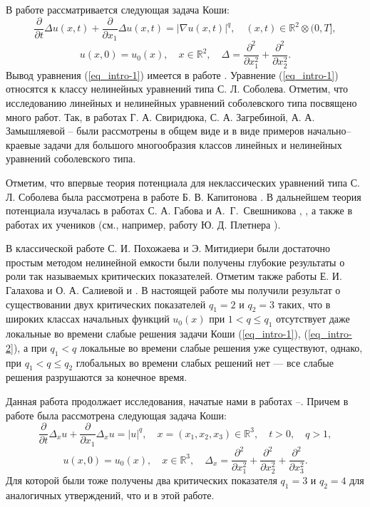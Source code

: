 В работе рассматривается следующая задача Коши:
\begin{equation}\label{eq_intro-1}
\dfrac{\partial}{\partial t}\Delta u(x,t)+\dfrac{\partial}{\partial x_1}\Delta u(x,t)=|\nabla u(x,t)|^q,\quad (x,t)\in\mathbb{R}^2\otimes(0,T],
\end{equation}
\begin{equation}\label{eq_intro-2}
u(x,0)=u_0(x),\quad x\in\mathbb{R}^2,\quad\Delta=\dfrac{\partial^2}{\partial x^2_1}+\dfrac{\partial^2}{\partial x^2_2}.
\end{equation}
Вывод уравнения (\ref{eq_intro-1}) имеется в работе \cite{bagdoev}. Уравнение (\ref{eq_intro-1}) относятся к классу нелинейных уравнений типа С. Л. Соболева. Отметим, что исследованию линейных и нелинейных уравнений соболевского типа посвящено много работ. Так, в работах Г. А. Свиридюка, С. А. Загребиной, А. А. Замышляевой \cite{svirid1}--\cite{svirid3} были рассмотрены в общем виде и в виде примеров начально--краевые задачи для большого многообразия классов линейных и нелинейных уравнений соболевского типа.

Отметим, что впервые теория потенциала для неклассических уравнений типа С. Л. Соболева была рассмотрена в работе Б. В. Капитонова \cite{Kapitonov}. В дальнейшем теория потенциала изучалась в работах С. А. Габова и А.~Г.~Свешникова \cite{sveshnikov}, \cite{Gabov2}, а также в работах их учеников (см., например, работу Ю. Д. Плетнера \cite{pletner}).

В классической работе \cite{pokhozaev1} С. И. Похожаева и Э. Митидиери были достаточно простым методом нелинейной емкости были получены глубокие результаты
о роли так называемых критических показателей. Отметим также работы Е. И. Галахова и О. А. Салиевой \cite{gala1} и \cite{gala2}. В настоящей работе мы получили результат о существовании двух критических показателей $q_1=2$ и $q_2=3$ таких, что
в широких классах начальных функций $u_0(x)$ при $1<q\leqslant q_1$ отсутствует даже локальные во времени слабые решения задачи Коши (\ref{eq_intro-1}), (\ref{eq_intro-2}), а при $q_1<q$ локальные во времени слабые решения уже существуют, однако, при $q_1<q\leqslant q_2$ глобальных во времени слабых решений нет --- все слабые решения разрушаются за конечное время.

Данная работа продолжает исследования, начатые нами в работах \cite{korpusov1}--\cite{korpusov5}. Причем в работе \cite{korpusov5}
была рассмотрена следующая задача Коши:
$$
\dfrac{\partial}{\partial t}\Delta_x u+\dfrac{\partial}{\partial x_1}\Delta_xu=|u|^q,\quad x=(x_1,x_2,x_3)\in\mathbb{R}^3,\quad t>0,\quad q>1,
$$
$$
u(x,0)=u_0(x),\quad x\in\mathbb{R}^3,\quad\Delta_x=\dfrac{\partial^2}{\partial x^2_1}+\dfrac{\partial^2}{\partial x^2_2}+\dfrac{\partial^2}{\partial x_3^2}.
$$
Для которой были тоже получены два критических показателя $q_1=3$ и $q_2=4$ для аналогичных утверждений, что и в этой работе.

